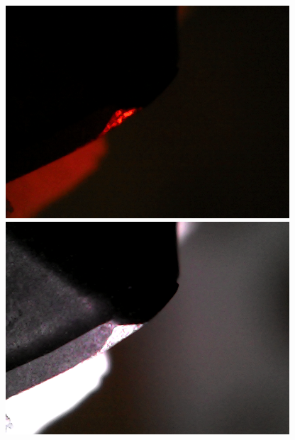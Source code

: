 \documentclass{scrartcl}
\begin{document}
\includegraphics[width=4.166667in, keepaspectratio=true]{./Masterproef_Tool_Wear_Inspection_-_Update_4_TG/p4_l9.png}\includegraphics[width=4.166667in, keepaspectratio=true]{./Masterproef_Tool_Wear_Inspection_-_Update_4_TG/p4.png}
\end{document}
